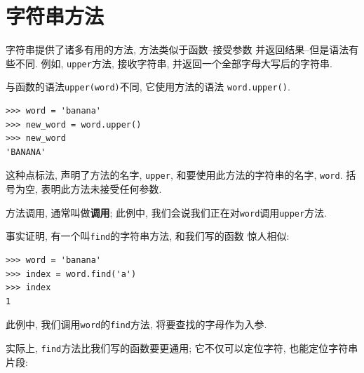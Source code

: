 \documentclass[10pt]{book}
\begin{document}
\section{字符串方法}
\label{optional}
字符串提供了诸多有用的方法, 方法类似于函数--接受参数
并返回结果--但是语法有些不同. 
例如, {\tt upper}方法, 接收字符串, 
并返回一个全部字母大写后的字符串. 

与函数的语法{\tt upper(word)}不同, 
它使用方法的语法 {\tt word.upper()}.

\begin{verbatim}
>>> word = 'banana'
>>> new_word = word.upper()
>>> new_word
'BANANA'
\end{verbatim}
%
这种点标法, 声明了方法的名字, {\tt upper}, 
和要使用此方法的字符串的名字, {\tt word}. 
括号为空, 表明此方法未接受任何参数. 

方法调用, 通常叫做{\bf 调用};
此例中, 我们会说我们正在对{\tt word}调用{\tt upper}方法. 

事实证明, 有一个叫{\tt find}的字符串方法, 和我们写的函数
惊人相似:

\begin{verbatim}
>>> word = 'banana'
>>> index = word.find('a')
>>> index
1
\end{verbatim}
%
此例中, 我们调用{\tt word}的{\tt find}方法, 将要查找的字母作为入参. 

实际上, {\tt find}方法比我们写的函数要更通用;
它不仅可以定位字符, 也能定位字符串片段:
\end{document}
